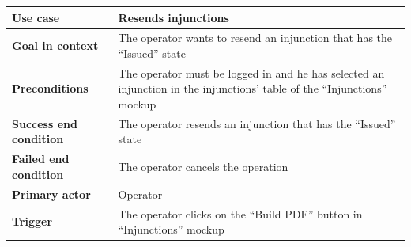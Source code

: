 {{{			\begin{table}[h]
			\begin{tabular}{|p{4cm}|p{10cm}|}
			\hline
				\centering \vspace{1mm} \bfseries{Use case} \vspace{1mm} & 
				\vspace{1mm} Resends injunctions \vspace{1mm}\\
			\hline
				\centering \vspace{1mm} \bfseries{Goal in context} \vspace{1mm} & 
				\vspace{1mm} The operator wants to resend an injunction that has the “Issued” state \vspace{1mm}\\
			\hline
				\centering \vspace{1mm} \bfseries{Preconditions} \vspace{1mm} & 
				\vspace{1mm} The operator must be logged in and he has selected an injunction in the injunctions’ table of the “Injunctions” mockup \vspace{1mm}\\
			\hline
				\centering \vspace{1mm} \bfseries{Success end condition} \vspace{1mm} & 
				\vspace{1mm} The operator resends an injunction that has the “Issued” state	 \vspace{1mm}\\
			\hline
				\centering \vspace{1mm} \bfseries{Failed end condition} \vspace{1mm} & 
				\vspace{1mm} The operator cancels the operation \vspace{1mm}\\
			\hline
				\centering \vspace{1mm} \bfseries{Primary actor} \vspace{1mm} & 
				\vspace{1mm} Operator \vspace{1mm}\\
			\hline
				\centering \vspace{1mm} \bfseries{Trigger} \vspace{1mm} & 
				\vspace{1mm}The operator clicks on the “Build PDF” button in “Injunctions” mockup \vspace{1mm}\\
			\hline
			\end{tabular}
			\end{table}

}}}
